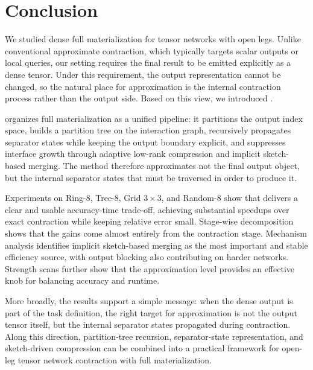 \section{Conclusion}

We studied dense full materialization for tensor networks with open legs. Unlike conventional approximate contraction, which typically targets scalar outputs or local queries, our setting requires the final result to be emitted explicitly as a dense tensor. Under this requirement, the output representation cannot be changed, so the natural place for approximation is the internal contraction process rather than the output side. Based on this view, we introduced \method{}.

\method{} organizes full materialization as a unified pipeline: it partitions the output index space, builds a partition tree on the interaction graph, recursively propagates separator states while keeping the output boundary explicit, and suppresses interface growth through adaptive low-rank compression and implicit sketch-based merging. The method therefore approximates not the final output object, but the internal separator states that must be traversed in order to produce it.

Experiments on Ring-8, Tree-8, Grid $3\times 3$, and Random-8 show that \method{} delivers a clear and usable accuracy-time trade-off, achieving substantial speedups over exact contraction while keeping relative error small. Stage-wise decomposition shows that the gains come almost entirely from the contraction stage. Mechanism analysis identifies implicit sketch-based merging as the most important and stable efficiency source, with output blocking also contributing on harder networks. Strength scans further show that the approximation level provides an effective knob for balancing accuracy and runtime.

More broadly, the results support a simple message: when the dense output is part of the task definition, the right target for approximation is not the output tensor itself, but the internal separator states propagated during contraction. Along this direction, partition-tree recursion, separator-state representation, and sketch-driven compression can be combined into a practical framework for open-leg tensor network contraction with full materialization.
